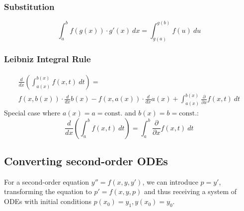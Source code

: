 \subsubsection{Substitution}
\begin{equation*}
    \int_a^b f(g(x))\cdot g'(x)\ dx = \int_{g(a)}^{g(b)}f(u)\ du
\end{equation*}

\subsubsection{Leibniz Integral Rule}
\begin{multline*}
    \frac{d}{dx}\left(\int_{a(x)}^{b(x)}f(x,t)\ dt\right)
    =
    \\
    f(x,b(x))\cdot\frac{d}{dx}b(x)
    -f(x,a(x))\cdot\frac{d}{dx}a(x)
    +\int_{a(x)}^{b(x)}\frac{\partial}{\partial x}f(x,t)\ dt
\end{multline*}
Special case where $a(x)=a=\mathrm{const.}$ and $b(x)=b=\mathrm{const.}$:
\begin{equation*}
    \frac{d}{dx}\left(\int_a^b f(x,t)\ dt\right)
    =\int_a^b\frac{\partial}{\partial x}f(x,t)\ dt
\end{equation*}

\subsection{Converting second-order ODEs}

For a second-order equation $y''=f(x,y,y')$, we can introduce $p=y'$, transforming the equation
to $p'=f(x,y,p)$ and thus receiving a system of ODEs with initial conditions
$p(x_0)=y_1, y(x_0) = y_0$.
